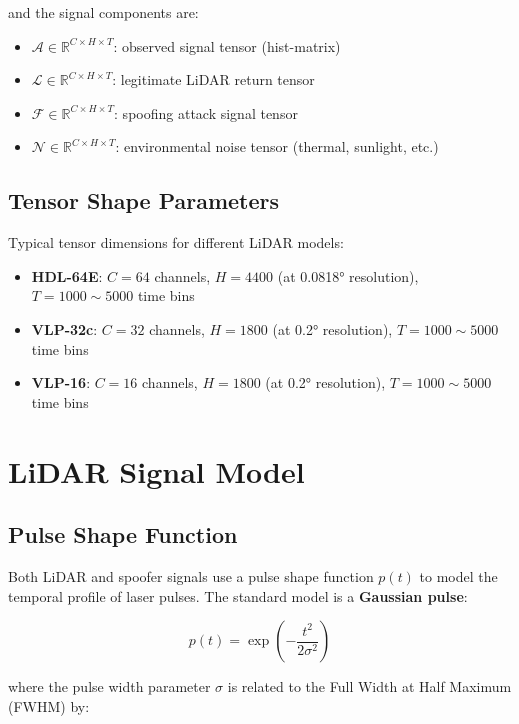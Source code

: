\documentclass[11pt]{article}
\begin{document}
and the signal components are:
\begin{itemize}
    \item $\bm{\mathcal{A}} \in \mathbb{R}^{C \times H \times T}$: observed signal tensor (hist-matrix)
    \item $\bm{\mathcal{L}} \in \mathbb{R}^{C \times H \times T}$: legitimate LiDAR return tensor
    \item $\bm{\mathcal{F}} \in \mathbb{R}^{C \times H \times T}$: spoofing attack signal tensor
    \item $\bm{\mathcal{N}} \in \mathbb{R}^{C \times H \times T}$: environmental noise tensor (thermal, sunlight, etc.)
\end{itemize}

\subsection{Tensor Shape Parameters}

Typical tensor dimensions for different LiDAR models:
\begin{itemize}
    \item \textbf{HDL-64E}: $C = 64$ channels, $H = 4400$ (at 0.0818° resolution), $T = 1000\sim5000$ time bins
    \item \textbf{VLP-32c}: $C = 32$ channels, $H = 1800$ (at 0.2° resolution), $T = 1000\sim5000$ time bins
    \item \textbf{VLP-16}: $C = 16$ channels, $H = 1800$ (at 0.2° resolution), $T = 1000\sim5000$ time bins
\end{itemize}

\section{LiDAR Signal Model}

\subsection{Pulse Shape Function}

Both LiDAR and spoofer signals use a pulse shape function $p(t)$ to model the temporal profile of laser pulses. The standard model is a \textbf{Gaussian pulse}:

\begin{equation}
p(t) = \exp\left(-\frac{t^2}{2\sigma^2}\right)
\end{equation}

where the pulse width parameter $\sigma$ is related to the Full Width at Half Maximum (FWHM) by:
\end{document}
